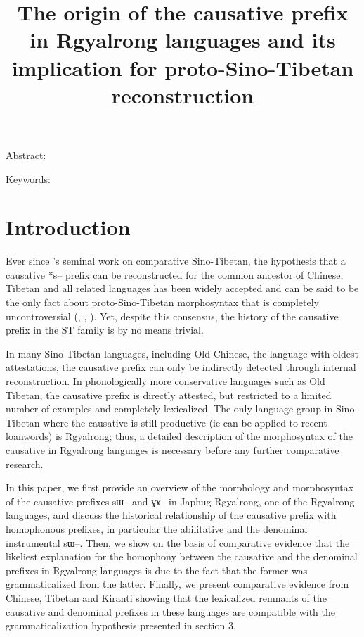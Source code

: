 \documentclass[oldfontcommands,oneside,a4paper,11pt]{article}
\newcommand{\ipa}[1]{{\phon \mbox{#1}}} %
\begin{document}
 
\linenumbers
\title{The origin of the causative prefix in Rgyalrong languages and its implication for proto-Sino-Tibetan reconstruction}
\maketitle

Abstract:

Keywords: 

\section{Introduction}

Ever since \citet{conrady1896}'s seminal work on comparative Sino-Tibetan, the hypothesis that a causative *s-- prefix can be reconstructed for the  common ancestor of Chinese, Tibetan and all related languages has been widely accepted and can be said to be the only fact about proto-Sino-Tibetan morphosyntax that is completely uncontroversial (\citealt{benedict72}, \citealt{matisoff03}, \citealt{lapolla03}).  Yet, despite this consensus, the history of the causative prefix in the ST family is by no means trivial. 

In many Sino-Tibetan languages, including Old Chinese, the  language with oldest attestations, the causative prefix can only be indirectly detected through internal reconstruction. In  phonologically more conservative languages such as Old Tibetan, the causative prefix is directly attested, but restricted to a limited number of examples and completely lexicalized. The only language group in Sino-Tibetan where the causative is still productive (ie can be applied to recent loanwords) is Rgyalrong; thus, a detailed description of the morphosyntax of the causative in Rgyalrong languages is necessary before any further comparative research.

In this paper, we first provide an overview of the morphology and morphosyntax of the causative prefixes \ipa{sɯ--} and \ipa{ɣɤ--} in Japhug Rgyalrong, one of the Rgyalrong languages, and discuss the historical relationship of the causative prefix with homophonous prefixes, in particular the abilitative and the denominal instrumental \ipa{sɯ--}. Then, we show on the basis of comparative evidence that the likeliest explanation for the homophony between the causative and the denominal prefixes in Rgyalrong languages is due to the fact that the former was grammaticalized from the latter.
Finally, we present comparative evidence from Chinese, Tibetan and Kiranti showing that the lexicalized remnants of the causative and denominal prefixes in these languages are compatible with the grammaticalization hypothesis presented in section 3.
\end{document}
